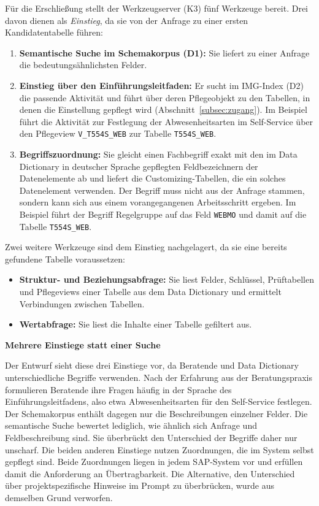 Für die Erschließung stellt der Werkzeugserver (K3) fünf Werkzeuge bereit. Drei davon dienen als \emph{Einstieg}, da sie von der Anfrage zu einer ersten Kandidatentabelle führen:
\begin{enumerate}
	\item \textbf{Semantische Suche im Schemakorpus (D1):} Sie liefert zu einer Anfrage die bedeutungsähnlichsten Felder.
	\item \textbf{Einstieg über den Einführungsleitfaden:} Er sucht im IMG-Index (D2) die passende Aktivität und führt über deren Pflegeobjekt zu den Tabellen, in denen die Einstellung gepflegt wird (Abschnitt~\ref{subsec:zugang}). Im Beispiel führt die Aktivität zur Festlegung der Abwesenheitsarten im Self-Service über den Pflegeview \texttt{V\_T554S\_WEB} zur Tabelle \texttt{T554S\_WEB}.
	\item \textbf{Begriffszuordnung:} Sie gleicht einen Fachbegriff exakt mit den im Data Dictionary in deutscher Sprache gepflegten Feldbezeichnern der Datenelemente ab und liefert die Customizing-Tabellen, die ein solches Datenelement verwenden. Der Begriff muss nicht aus der Anfrage stammen, sondern kann sich aus einem vorangegangenen Arbeitsschritt ergeben. Im Beispiel führt der Begriff \glqq Regelgruppe\grqq{} auf das Feld \texttt{WEBMO} und damit auf die Tabelle \texttt{T554S\_WEB}.
\end{enumerate}
Zwei weitere Werkzeuge sind dem Einstieg nachgelagert, da sie eine bereits gefundene Tabelle voraussetzen:
\begin{itemize}
	\item \textbf{Struktur- und Beziehungsabfrage:} Sie liest Felder, Schlüssel, Prüftabellen und Pflegeviews einer Tabelle aus dem Data Dictionary und ermittelt Verbindungen zwischen Tabellen.
	\item \textbf{Wertabfrage:} Sie liest die Inhalte einer Tabelle gefiltert aus.
\end{itemize}

\textbf{Mehrere Einstiege statt einer Suche}

Der Entwurf sieht diese drei Einstiege vor, da Beratende und Data Dictionary unterschiedliche Begriffe verwenden. Nach der Erfahrung aus der Beratungspraxis formulieren Beratende ihre Fragen häufig in der Sprache des Einführungsleitfadens, also etwa \glqq Abwesenheitsarten für den Self-Service festlegen\grqq. Der Schemakorpus enthält dagegen nur die Beschreibungen einzelner Felder. Die semantische Suche bewertet lediglich, wie ähnlich sich Anfrage und Feldbeschreibung sind. Sie überbrückt den Unterschied der Begriffe daher nur unscharf. Die beiden anderen Einstiege nutzen Zuordnungen, die im System selbst gepflegt sind. Beide Zuordnungen liegen in jedem SAP-System vor und erfüllen damit die Anforderung an Übertragbarkeit. Die Alternative, den Unterschied über projektspezifische Hinweise im Prompt zu überbrücken, wurde aus demselben Grund verworfen.

